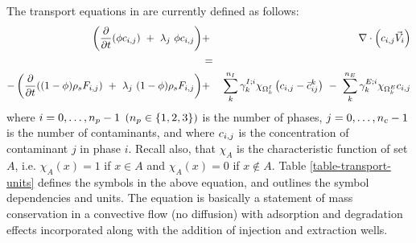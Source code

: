The transport equations in \parflow{} are currently defined as follows:
\begin{eqnarray} \label{eqn-transport}
\left ( \frac{\partial}{\partial t} (\phi c_{i,j}) ~+~ \lambda_j ~ \phi c_{i,j} \right ) & + & \nabla \cdot \left ( c_{i,j} {\vec V}_i \right ) \nonumber \\
& = & \\
-\left ( \frac{\partial}{\partial t} ((1 - \phi) \rho_{s} F_{i,j}) ~+~  \lambda_j ~ (1 - \phi) \rho_{s} F_{i,j} \right ) & + & \sum_{k}^{n_{I}} \gamma^{I;i}_{k} \chi_{\Omega^{I}_{k}} \left ( c_{i,j} - {\bar c}^{k}_{ij} \right ) ~-~ \sum_{k}^{n_{E}} \gamma^{E;i}_{k} \chi_{\Omega^{E}_{k}} c_{i,j} \nonumber
\end{eqnarray}
where $i = 0, \ldots , n_p - 1$ $(n_p \in \{1,2,3\})$
is the number of phases,
$j = 0, \ldots , n_c - 1$ is the number of contaminants, and where
$c_{i,j}$ is the concentration of contaminant $j$ in phase $i$.  Recall also,
that $\chi_A$ is the characteristic function of set $A$, i.e. $\chi_A(x) = 1$
if $x \in A$ and $\chi_A(x) = 0$ if $x \not\in A$.
Table \ref{table-transport-units} defines the symbols in the above equation,
and outlines the symbol dependencies and units.  The equation is basically
a statement of mass conservation in a convective flow (no diffusion) with
adsorption and degradation effects incorporated along with the addition of
injection and extraction wells.
